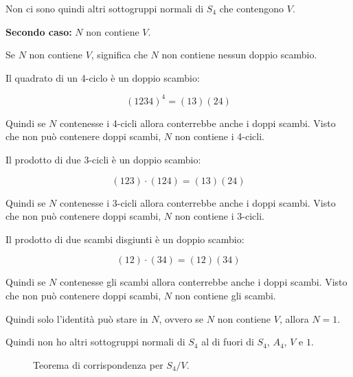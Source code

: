 \begin{soluzione}
	
	Non ci sono quindi altri sottogruppi normali di $S_4$ che contengono $V$.
	
	\textbf{Secondo caso:} $N$ non contiene $V$.
	
	Se $N$ non contiene $V$, significa che $N$ non contiene nessun doppio scambio.
	
	Il quadrato di un 4-ciclo è un doppio scambio:
	
	\begin{equation}
		(1234)^4 = (13)(24)
	\end{equation}
	
	Quindi se $N$ contenesse i 4-cicli allora conterrebbe anche i doppi scambi. Visto che non può contenere doppi scambi, $N$ non contiene i 4-cicli.
	
	Il prodotto di due 3-cicli è un doppio scambio:
	
	\begin{equation}
		(123) \cdot (124) = (13)(24)
	\end{equation}

	Quindi se $N$ contenesse i 3-cicli allora conterrebbe anche i doppi scambi. Visto che non può contenere doppi scambi, $N$ non contiene i 3-cicli.
	
	Il prodotto di due scambi disgiunti è un doppio scambio:
	
	\begin{equation}
		(12)\cdot (34) = (12)(34)
	\end{equation}

	Quindi se $N$ contenesse gli scambi allora conterrebbe anche i doppi scambi. Visto che non può contenere doppi scambi, $N$ non contiene gli scambi.

	Quindi solo l'identità può stare in $N$, ovvero se $N$ non contiene $V$, allora $N = 1$.
	
	Quindi non ho altri sottogruppi normali di $S_4$ al di fuori di $S_4$, $A_4$, $V$ e $1$.
\end{soluzione}
	\begin{figure}[tp]
	\centering
	\caption{Teorema di corrispondenza per $S_4/V$.}
	\label{fig:corrispondenza_per_S4_su_V}
\end{figure}

